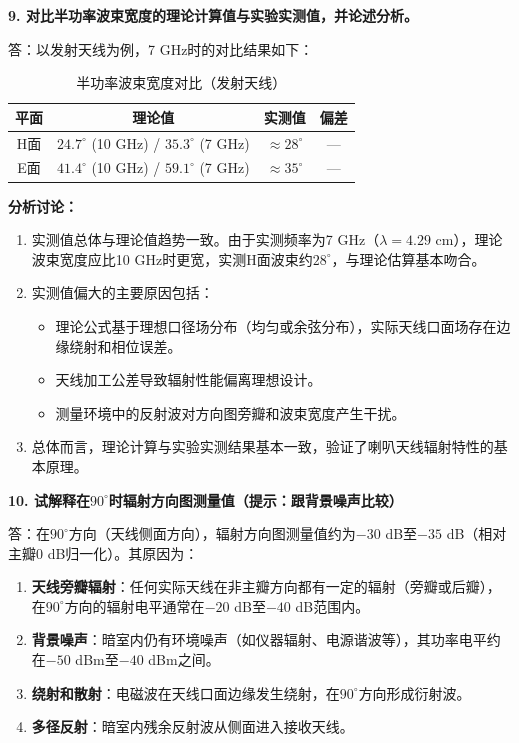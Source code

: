 \documentclass[12pt,a4paper]{article}
\begin{document}
\textbf{9. 对比半功率波束宽度的理论计算值与实验实测值，并论述分析。}

答：以发射天线为例，7 GHz时的对比结果如下：

\begin{table}[H]
\centering
\caption{半功率波束宽度对比（发射天线）}
\begin{tabular}{c|c|c|c}
\hline
\textbf{平面} & \textbf{理论值} & \textbf{实测值} & \textbf{偏差} \\
\hline
H面 & $24.7^\circ$ (10 GHz) / $35.3^\circ$ (7 GHz) & $\approx 28^\circ$ & — \\
E面 & $41.4^\circ$ (10 GHz) / $59.1^\circ$ (7 GHz) & $\approx 35^\circ$ & — \\
\hline
\end{tabular}
\end{table}

\textbf{分析讨论：}
\begin{enumerate}
    \item 实测值总体与理论值趋势一致。由于实测频率为7 GHz（$\lambda = 4.29$ cm），理论波束宽度应比10 GHz时更宽，实测H面波束约$28^\circ$，与理论估算基本吻合。
    \item 实测值偏大的主要原因包括：
    \begin{itemize}
        \item 理论公式基于理想口径场分布（均匀或余弦分布），实际天线口面场存在边缘绕射和相位误差。
        \item 天线加工公差导致辐射性能偏离理想设计。
        \item 测量环境中的反射波对方向图旁瓣和波束宽度产生干扰。
    \end{itemize}
    \item 总体而言，理论计算与实验实测结果基本一致，验证了喇叭天线辐射特性的基本原理。
\end{enumerate}


\textbf{10. 试解释在$90^\circ$时辐射方向图测量值（提示：跟背景噪声比较）}

答：在$90^\circ$方向（天线侧面方向），辐射方向图测量值约为$-30$ dB至$-35$ dB（相对主瓣$0$ dB归一化）。其原因为：

\begin{enumerate}
    \item \textbf{天线旁瓣辐射}：任何实际天线在非主瓣方向都有一定的辐射（旁瓣或后瓣），在$90^\circ$方向的辐射电平通常在$-20$ dB至$-40$ dB范围内。
    \item \textbf{背景噪声}：暗室内仍有环境噪声（如仪器辐射、电源谐波等），其功率电平约在$-50$ dBm至$-40$ dBm之间。
    \item \textbf{绕射和散射}：电磁波在天线口面边缘发生绕射，在$90^\circ$方向形成衍射波。
    \item \textbf{多径反射}：暗室内残余反射波从侧面进入接收天线。
\end{enumerate}
\end{document}
